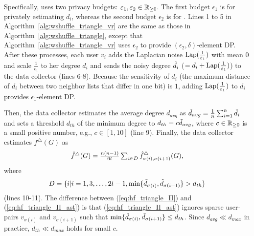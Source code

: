 Specifically, \AlgWSTriVR{} uses two privacy budgets: $\varepsilon_1, \varepsilon_2 \in \mathbb{R}_{\ge0}$.
The first budget $\epsilon_1$ is for privately estimating $d_i$, whereas the second budget $\epsilon_2$ is for
\AlgWSLE{}.
Lines 1 to 5 in Algorithm~\ref{alg:wshuffle_triangle_vr} are the same as those in Algorithm~\ref{alg:wshuffle_triangle}, except that Algorithm~\ref{alg:wshuffle_triangle_vr} uses $\epsilon_2$
to provide $(\epsilon_2, \delta)$-element DP.
After these processes, each user $v_i$ adds the Laplacian noise $\textrm{Lap}(\frac{1}{\varepsilon_1})$ with mean $0$ and scale $\frac{1}{\epsilon_1}$ to her degree $d_i$ and sends the noisy degree $\tilde{d}_i$ ($= d_i + \textrm{Lap}(\frac{1}{\varepsilon_1})$) to the data collector (lines 6-8).
Because the sensitivity \cite{DP} of $d_i$ (the maximum distance of $d_i$ between two neighbor lists that differ in one bit) is $1$, adding $\textrm{Lap}(\frac{1}{\varepsilon_1})$ to $d_i$ provides $\epsilon_1$-element DP.

Then, the data collector estimates the average degree $d_{avg}$ as $\tilde{d}_{avg} = \frac{1}{n}\sum_{i=1}^n \tilde{d}_i$ and sets a threshold $d_{th}$ of the minimum degree to $d_{th} = c \tilde{d}_{avg}$, where $c \in \mathbb{R}_{\ge0}$ is a small positive number, e.g.,
$c \in [1,10]$ (line 9).
Finally, the data collector estimates $f^\triangle(G)$ as
\begin{align}
    \textstyle{\hat{f}^\triangle(G) = \frac{n(n-1)}{6t} \sum_{i \in D} \hat{f}_{\sigma(i),\sigma(i+1)}^\triangle(G),}
   \label{eq:hf_triangle_II_ast}
\end{align}
where
\begin{align*}
D = \{i | i = 1, 3, \ldots, 2t-1,
  \min\{\tilde{d}_{\sigma(i)}, \tilde{d}_{\sigma(i+1)}\} > d_{th}\}
\end{align*}
(lines 10-11).
The difference between (\ref{eq:hf_triangle_II}) and (\ref{eq:hf_triangle_II_ast}) is that (\ref{eq:hf_triangle_II_ast}) ignores sparse user-pairs $v_{\sigma(i)}$ and $v_{\sigma(i+1)}$ such that $\min\{\tilde{d}_{\sigma(i)}, \tilde{d}_{\sigma(i+1)}\} \leq d_{th}$.
Since
$d_{avg} \ll d_{max}$ in practice,
$d_{th} \ll d_{max}$
holds for small $c$.

